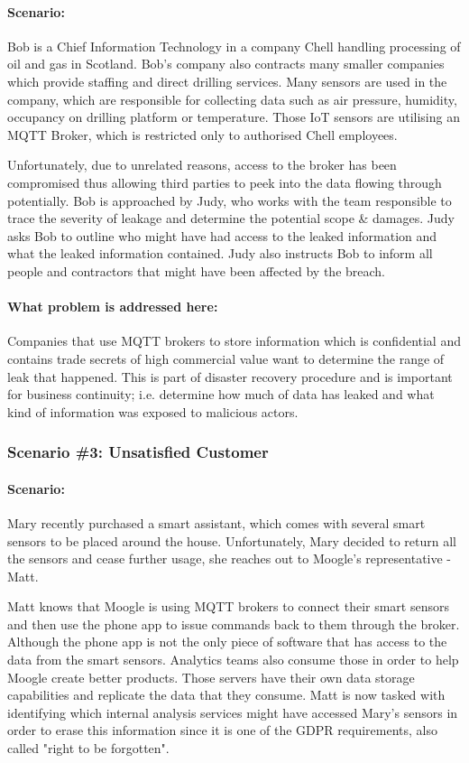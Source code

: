 \paragraph{\textbf{Scenario:}}
Bob is a Chief Information Technology in a company Chell handling processing of oil and gas in Scotland. Bob's company also contracts many smaller companies which provide staffing and direct drilling services. Many sensors are used in the company, which are responsible for collecting data such as air pressure, humidity, occupancy on drilling platform or temperature. Those IoT sensors are utilising an MQTT Broker, which is restricted only to authorised Chell employees.

Unfortunately, due to unrelated reasons, access to the broker has been compromised thus allowing third parties to peek into the data flowing through potentially. Bob is approached by Judy, who works with the team responsible to trace the severity of leakage and determine the potential scope \& damages. Judy asks Bob to outline who might have had access to the leaked information and what the leaked information contained. Judy also instructs Bob to inform all people and contractors that might have been affected by the breach.
\paragraph{\textbf{What problem is addressed here:}}
Companies that use MQTT brokers to store information which is confidential and contains trade secrets of high commercial value want to determine the range of leak that happened. This is part of disaster recovery procedure and is important for business continuity; i.e. determine how much of data has leaked and what kind of information was exposed to malicious actors. 
\\
\subsubsection{Scenario \#3: Unsatisfied Customer}
\paragraph{\textbf{Scenario:}}
Mary recently purchased a smart assistant, which comes with several smart sensors to be placed around the house. Unfortunately, Mary decided to return all the sensors and cease further usage, she reaches out to Moogle's representative - Matt.

Matt knows that Moogle is using MQTT brokers to connect their smart sensors and then use the phone app to issue commands back to them through the broker. Although the phone app is not the only piece of software that has access to the data from the smart sensors. Analytics teams also consume those in order to help Moogle create better products. Those servers have their own data storage capabilities and replicate the data that they consume. Matt is now tasked with identifying which internal analysis services might have accessed Mary's sensors in order to erase this information since it is one of the GDPR requirements, also called "right to be forgotten".
